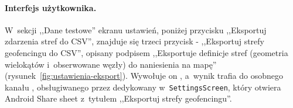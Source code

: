 \paragraph{Interfejs użytkownika.}

W~sekcji ,,Dane testowe'' ekranu ustawień, poniżej przycisku ,,Eksportuj zdarzenia stref
do CSV'', znajduje się trzeci przycisk - ,,Eksportuj strefy geofencingu do CSV'', opisany
podpisem ,,Eksportuje definicje stref (geometria wielokątów i~obserwowane węzły) do
naniesienia na mapę'' (rysunek~\ref{fig:ustawienia-eksport}). Wywołuje on
\texttt{}, a~wynik trafia do osobnego
kanału \texttt{}, obsługiwanego przez dedykowany
\texttt{} w~\texttt{SettingsScreen}, który otwiera Android Share
sheet z~tytułem ,,Eksportuj strefy geofencingu''.
